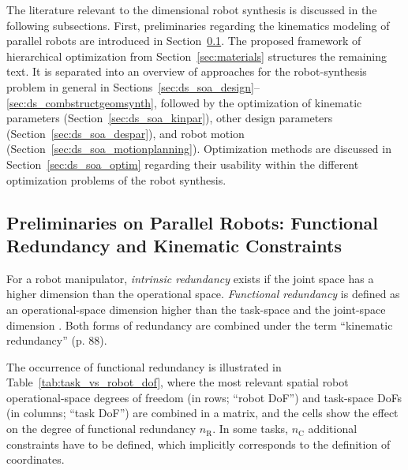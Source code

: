 %
%
%
\label{sec:relatedwork}

%
%


The literature relevant to the dimensional robot synthesis is discussed in the following subsections.
First, preliminaries regarding the kinematics modeling of parallel robots are introduced in Section~\ref{sec:ds_parrob_preliminaries}.
The proposed framework of hierarchical optimization from Section~\ref{sec:materials} structures the remaining text.
%
%
It is separated into an overview of approaches for the robot-synthesis problem in general in Sections~\ref{sec:ds_soa_design}--%
\ref{sec:ds_combstructgeomsynth}, followed by the optimization of kinematic parameters (Section~\ref{sec:ds_soa_kinpar}), other design parameters (Section~\ref{sec:ds_soa_despar}), and robot motion (Section~\ref{sec:ds_soa_motionplanning}).
%
Optimization methods are discussed in Section~\ref{sec:ds_soa_optim} regarding their usability within the different optimization problems of the robot synthesis.
%
%
%
%
%

\subsection{Preliminaries on Parallel Robots: Functional Redundancy and Kinematic Constraints}
\label{sec:ds_parrob_preliminaries}



%

%

For a robot manipulator, \emph{intrinsic redundancy} exists if the joint space has a higher dimension than the operational space. %
\emph{Functional redundancy} is defined as an operational-space dimension higher than the task-space and the joint-space dimension \cite{ConkurBuc1997,SciaviccoSicVilOri2009,HuoBar2008,LegerAng2016}. %
%
%
Both forms of redundancy are combined under the term ``kinematic redundancy'' \cite{SciaviccoSicVilOri2009} (p. 88).
%



The occurrence of functional redundancy is illustrated in Table~\ref{tab:task_vs_robot_dof}, where the most relevant spatial robot operational-space degrees of freedom (in rows; ``robot DoF'') and task-space DoFs (in columns; ``task DoF'') are combined in a matrix, and the cells show the effect on the degree of functional redundancy $n_\mathrm{R}$. %
In some tasks, $n_\mathrm{C}$ additional constraints have to be defined, which implicitly corresponds to the definition of coordinates.


